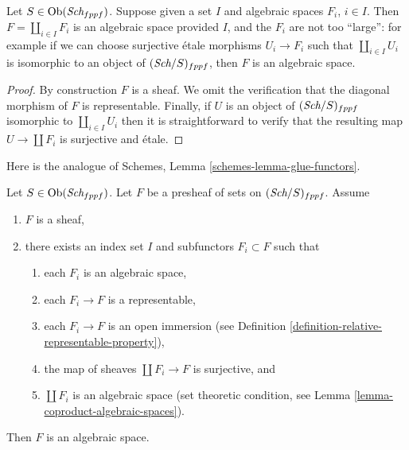 \begin{lemma}
\label{lemma-coproduct-algebraic-spaces}
Let $S \in \mathop{\rm Ob}\nolimits(\textit{Sch}_{fppf})$.
Suppose given a set $I$ and algebraic spaces $F_i$, $i \in I$.
Then $F = \coprod_{i \in I} F_i$ is an algebraic space
provided $I$, and the $F_i$ are not too ``large'': for example if we
can choose surjective \'etale morphisms $U_i \to F_i$ such that
$\coprod_{i \in I} U_i$ is isomorphic to an object of
$(\textit{Sch}/S)_{fppf}$, then $F$ is an algebraic space.
\end{lemma}

\begin{proof}
By construction $F$ is a sheaf. We omit the verification that the
diagonal morphism of $F$ is representable. Finally, if $U$ is an
object of $(\textit{Sch}/S)_{fppf}$ isomorphic to $\coprod_{i \in I} U_i$
then it is straightforward to verify that the resulting map
$U \to \coprod F_i$ is surjective and \'etale.
\end{proof}

\noindent
Here is the analogue of Schemes, Lemma \ref{schemes-lemma-glue-functors}.

\begin{lemma}
\label{lemma-glueing-algebraic-spaces}
Let $S \in \mathop{\rm Ob}\nolimits(\textit{Sch}_{fppf})$.
Let $F$ be a presheaf of sets on $(\textit{Sch}/S)_{fppf}$.
Assume
\begin{enumerate}
\item $F$ is a sheaf,
\item there exists an index set $I$
and subfunctors $F_i \subset F$ such that
\begin{enumerate}
\item each $F_i$ is an algebraic space,
\item each $F_i \to F$ is a representable,
\item each $F_i \to F$ is an open immersion (see
Definition \ref{definition-relative-representable-property}),
\item the map of sheaves $\coprod F_i \to F$ is surjective, and
\item $\coprod F_i$ is an algebraic space (set theoretic condition, see
Lemma \ref{lemma-coproduct-algebraic-spaces}).
\end{enumerate}
\end{enumerate}
Then $F$ is an algebraic space.
\end{lemma}

